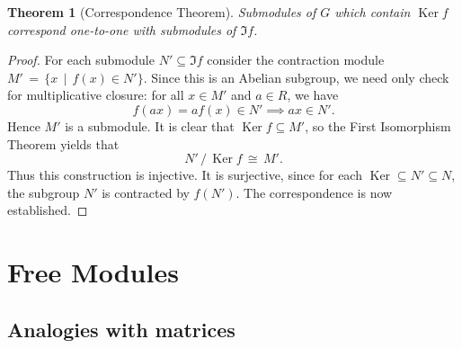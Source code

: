 \documentclass[11pt]{article}
\newtheorem{theorem}{Theorem}
\newcommand{\Ker}{\operatorname{Ker}}
\begin{document}
\begin{adjustwidth}{0.5cm}{}
  \begin{theorem}[Correspondence Theorem]
    Submodules of $G$ which contain $\Ker f$ correspond one-to-one with submodules of $\Im f$.
  \end{theorem}
  \begin{proof}
    For each submodule $N' \subseteq \Im f$ consider the contraction module $M' \, = \, \{ x \, \mid \, f(x) \in N' \}$. Since this is an Abelian subgroup, we need only check for multiplicative closure: for all $x \in M'$ and $a \in R$, we have
    \[
      f(ax) = a f(x) \in N' \implies ax \in N'.
    \]
    Hence $M'$ is a submodule. It is clear that $\Ker f \subseteq M'$, so the First Isomorphism Theorem yields that
    \[
      N' \, / \, \Ker f \, \cong \, M'.
    \]
    Thus this construction is injective. It is surjective, since for each $\Ker \subseteq N' \subseteq N$, the subgroup $N'$ is contracted by $f(N')$. The correspondence is now established.
  \end{proof}
\end{adjustwidth}


\section{Free Modules}


\subsection{Analogies with matrices}
\end{document}
